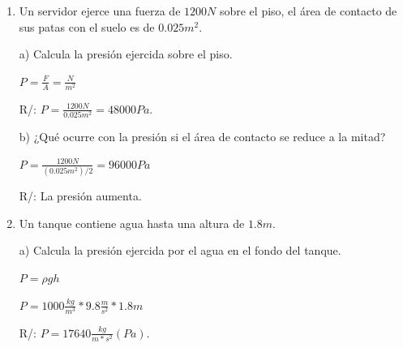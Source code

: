 \documentclass[a4paper, 11pt]{article}
\newcommand{\Pspace}{0.5cm}
\newcommand{\Aspace}{0.2cm}
\begin{document}
\begin{enumerate}
            \vspace{\Aspace} \par
            b) Calcula su densidad.
            \\ { \color{azul} 
                $\rho = \frac{M}{V}$
                \par R/: $\rho = \frac{0.85kg}{0.00075m^{3}} = 1133.33 \frac{kg}{m^{3}}$.
            }

            \vspace{\Aspace} \par
            c) ¿Flotaría sobre el agua?
            \\ { \color{azul} 
                $\rho_{Agua} = 1000 \frac{kg}{m^{3}}$
                \par $\rho = 1133.33 \frac{kg}{m^3}$
                \par $\rho_{Agua} < \rho_{Refrigeración}$
                \par R/: No flotaría dado que su densidad es mayor.
            }



        \vspace{\Pspace}
    \item Un servidor ejerce una fuerza de $1200N$ sobre el piso, el área de contacto de sus patas con el suelo es de $0.025m^{2}$. \par
            \vspace{\Aspace} \par
            a) Calcula la presión ejercida sobre el piso.
            \\ { \color{azul} 
                $P = \frac{F}{A} = \frac{N}{m^{2}}$
                \par R/: $P = \frac{1200N}{0.025m^{2}} = 48000 Pa$.
            }

            \vspace{\Aspace} \par
            b) ¿Qué ocurre con la presión si el área de contacto se reduce a la mitad?
            \\ { \color{azul} 
                $P = \frac{1200N}{(0.025m^{2})/2} = 96000 Pa$
                \par R/: La presión aumenta.
            }



        \vspace{\Pspace}
        \item Un tanque contiene agua hasta una altura de $1.8m$. \par
            \vspace{\Aspace} \par
            a) Calcula la presión ejercida por el agua en el fondo del tanque.
            \\ { \color{azul} 
                $P = \rho g h$
                \par $P = 1000\frac{kg}{m^{3}} * 9.8 \frac{m}{s^2} * 1.8m$
                \par R/: $P = 17640 \frac{kg}{m * s^2}(Pa)$.
            }


\end{enumerate}
\end{document}

